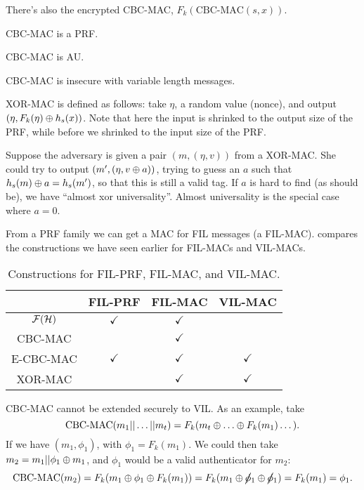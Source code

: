 There's also the encrypted \ac{CBC}-\ac{MAC}, \ie $F_k(\text{CBC-MAC}(s,x))$.

\begin{theorem}
	\ac{CBC}-\ac{MAC} is a \ac{PRF}.
\end{theorem}

\begin{theorem}
	\ac{CBC}-\ac{MAC} is \ac{AU}.
\end{theorem}

\ac{CBC}-\ac{MAC} is insecure with variable length messages.

XOR-\ac{MAC} is defined as follows: take $\eta$, a random value (nonce), and output $(\eta, F_k(\eta) \oplus h_s(x))$.
Note that here the input is shrinked to the output size of the \ac{PRF}, while before we shrinked to the input size of the \ac{PRF}.

Suppose the adversary is given a pair $(m, (\eta, v))$ from a XOR-\ac{MAC}.
She could try to output $(m', (\eta, v \oplus a))$, trying to guess an $a$ such that $h_s(m) \oplus a = h_s(m')$, so that this is still a valid tag.
If $a$ is hard to find (as should be), we have ``almost xor universality''.
Almost universality is the special case where $a = 0$.

From a \ac{PRF} family we can get a \ac{MAC} for \ac{FIL} messages (a \ac{FIL}-\ac{MAC}).
 compares the constructions we have seen earlier for \ac{FIL}-\acp{MAC} and \ac{VIL}-\acp{MAC}.

\begin{table}
	\centering
	\begin{tabular}{c|c|c|c}
		& \acs{FIL}-\acs{PRF} & \acs{FIL}-\acs{MAC} & \acs{VIL}-\acs{MAC} \\
		\hline
		$\mathcal{F}(\mathcal{H})$ & $\checkmark$ & $\checkmark$ &  \\
		\acs{CBC}-\acs{MAC} &  & $\checkmark$ &  \\
		E-\acs{CBC}-\acs{MAC} & $\checkmark$ & $\checkmark$ & $\checkmark$ \\
		XOR-\acs{MAC} &  & $\checkmark$ & $\checkmark$
	\end{tabular}
	\caption{Constructions for \acs{FIL}-\acs{PRF}, \acs{FIL}-\acs{MAC}, and \acs{VIL}-\acs{MAC}.}
	\label{tab:vil-fil-mac}
\end{table}

\ac{CBC}-\ac{MAC} cannot be extended securely to \ac{VIL}.
As an example, take
\begin{equation}
	\text{CBC-MAC}(m_1 || \dots || m_t) =
	F_k(m_t \xor \dots \xor F_k(m_1) \dots ).
\end{equation}
If we have $(m_1, \phi_1)$, with $\phi_1 = F_k(m_1)$.
We could then take $m_2 = m_1 || \phi_1 \oplus m_1$, and $\phi_1$ would be a valid authenticator for $m_2$:
\begin{equation*}
	\text{CBC-MAC}(m_2) = F_k(m_1 \oplus \phi_1 \oplus F_k(m_1)) = F_k(m_1 \oplus \cancel \phi_1 \oplus \cancel \phi_1) = F_k(m_1) = \phi_1.
\end{equation*}

